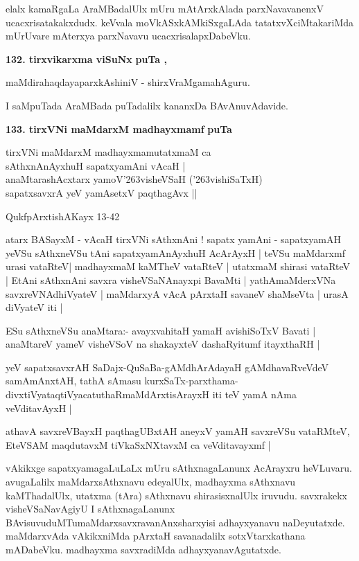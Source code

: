 \smallskip
elalx kamaRgaLa AraMBadalUlx mUru mAtArxkAlada parxNavavanenxV ucacxrisatakakxdudx. keVvala moVkASxkAMkiSxgaLAda tatatxvXciMtakariMda mUrUvare mAterxya parxNavavu ucacxrisalapxDabeVku.

\medskip
\noindent
\textbf{132. tirxvikarxma viSuNx} \hfill{\bf puTa , }

\hfill{maMdirahaqdayaparxkAshiniV - shirxVraMgamahAguru.}

\smallskip
I saMpuTada AraMBada puTadalilx kananxDa BAvAnuvAdavide.

\medskip
\noindent
\textbf{133. tirxVNi maMdarxM madhayxmamf} \hfill{\bf puTa }

\smallskip
\begin{shloka}
tirxVNi maMdarxM madhayxmamutatxmaM ca\\
sAthxnAnAyxhuH sapatxyamAni vAcaH |\\
anaMtarashAcxtarx yamoV\char'263visheVSaH (\char'263vishiSaTxH)\\
sapatxsavxrA yeV yamAsetxV paqthagAvx ||
\end{shloka}

\hfill{QukfpArxtishAKayx 13-42}

atarx BASayxM - vAcaH tirxVNi sAthxnAni ! sapatx yamAni - sapatxyamAH yeVSu sAthxneVSu tAni sapatxyamAnAyxhuH AcArAyxH | teVSu maMdarxmf urasi vataRteV| madhayxmaM kaMTheV vataRteV | utatxmaM shirasi vataRteV | EtAni sAthxnAni savxra visheVSaNAnayxpi BavaMti | yathAmaMderxVNa savxreVNAdhiVyateV | maMdarxyA vAcA pArxtaH savaneV shaMseVta | urasA diVyateV iti |

ESu sAthxneVSu anaMtara:- avayxvahitaH yamaH avishiSoTxV Bavati | anaMtareV yameV visheVSoV na shakayxteV dashaRyitumf itayxthaRH |

yeV sapatxsavxrAH SaDajx-QuSaBa-gAMdhArAdayaH gAMdhavaRveVdeV samAmAnxtAH, tathA sAmasu kurxSaTx-parxthama-divxtiVyataqtiVyacatuthaRmaMdArxtisArayxH iti teV yamA nAma veVditavAyxH |

athavA savxreVBayxH paqthagUBxtAH aneyxV yamAH savxreVSu vataRMteV, EteVSAM maqdutavxM tiVkaSxNXtavxM ca veVditavayxmf |

vAkikxge sapatxyamagaLuLaLx mUru sAthxnagaLanunx AcArayxru heVLuvaru. avugaLalilx maMdarxsAthxnavu edeyalUlx, madhayxma sAthxnavu kaMThadalUlx, utatxma (tAra) sAthxnavu shirasisxnalUlx iruvudu. savxrakekx visheVSaNavAgiyU I sAthxnagaLanunx BAvisuvuduMTumaMdarxsavxravanAnxsharxyisi adhayxyanavu naDeyutatxde. maMdarxvAda vAkikxniMda pArxtaH savanadalilx sotxVtarxkathana mADabeVku. madhayxma savxradiMda adhayxyanavAgutatxde.

